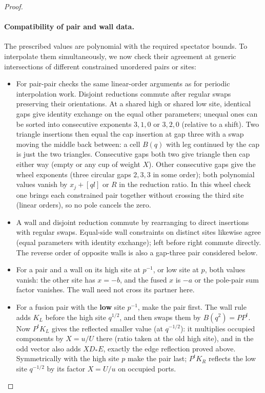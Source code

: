 \begin{proof}
\paragraph{Compatibility of pair and wall data.}
The prescribed values are polynomial with the required spectator bounds.
To interpolate them simultaneously, we now check their agreement at generic
intersections of different constrained unordered pairs or sites:
\begin{itemize}
\item For pair-pair checks the same linear-order arguments as for periodic interpolation work. Disjoint reductions commute after regular swaps preserving their orientations. At a shared high or shared low site, identical gaps give identity exchange on the equal other parameters; unequal ones can be sorted into consecutive exponents \(3,1,0\) or \(3,2,0\) (relative to a shift). Two triangle insertions then equal the cap insertion at gap three with a swap moving the middle back between: a cell \(B(q)\) with leg continued by the cap is just the two triangles. Consecutive gaps both two give triangle then cap either way (empty or any cup of weight \(X\)). Other consecutive gaps give the wheel exponents (three circular gaps \(2,3,3\) in some order); both polynomial values vanish by \(x_j+[q l]\) or \(R\) in the reduction ratio. In this wheel check one brings each constrained pair together without crossing the third site (linear orders), so no pole cancels the zero.
\item A wall and disjoint reduction commute by rearranging to direct insertions with regular swaps. Equal-side wall constraints on distinct sites likewise agree (equal parameters with identity exchange); left before right commute directly. The reverse order of opposite walls is also a gap-three pair considered below.
\item For a pair and a wall on its high site at \(p^{-1}\), or low site at \(p\), both values vanish: the other site has \(x=-b\), and the fused \(x\) is \(-a\) or the pole-pair sum factor vanishes. The wall need not cross its partner here.
\item For a fusion pair with the \textbf{low} site \(p^{-1}\), make the pair first. The wall rule adds \(K_L\) before the high site \(q^{1/2}\), and then swaps them by \(B(q^2)=P P^t\). Now \(P^t K_L\) gives the reflected smaller value (at \(q^{-1/2}\)): it multiplies occupied components by \(X=u/U\) there (ratio taken at the old high site), and in the odd vector also adds \(X D_* E\), exactly the edge reflection proved above. Symmetrically with the high site \(p\) make the pair last; \(P^t K_R\) reflects the low site \(q^{-1/2}\) by its factor \(X=U/u\) on occupied ports.

\end{itemize}
\end{proof}
